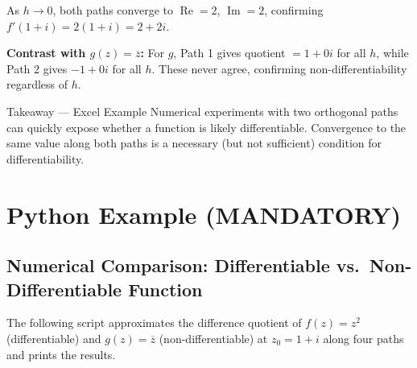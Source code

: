 \documentclass[12pt,a4paper]{article}
\begin{document}
\noindent As $h \to 0$, both paths converge to $\operatorname{Re}=2$, $\operatorname{Im}=2$,
confirming $f'(1+i) = 2(1+i) = 2+2i$.

\medskip
\noindent\textbf{Contrast with $g(z) = \overline{z}$:}
For $g$, Path 1 gives quotient $= 1 + 0i$ for all $h$,
while Path 2 gives $-1 + 0i$ for all $h$. These never agree,
confirming non-differentiability regardless of $h$.

\begin{learnbox}{Takeaway --- Excel Example}
Numerical experiments with two orthogonal paths can quickly expose whether a function
is likely differentiable. Convergence to the same value along both paths is a
necessary (but not sufficient) condition for differentiability.
\end{learnbox}

\section{Python Example (MANDATORY)}

\subsection*{Numerical Comparison: Differentiable vs.\ Non-Differentiable Function}

The following script approximates the difference quotient of $f(z) = z^2$ (differentiable)
and $g(z) = \overline{z}$ (non-differentiable) at $z_0 = 1 + i$ along four paths and
prints the results.
\end{document}
